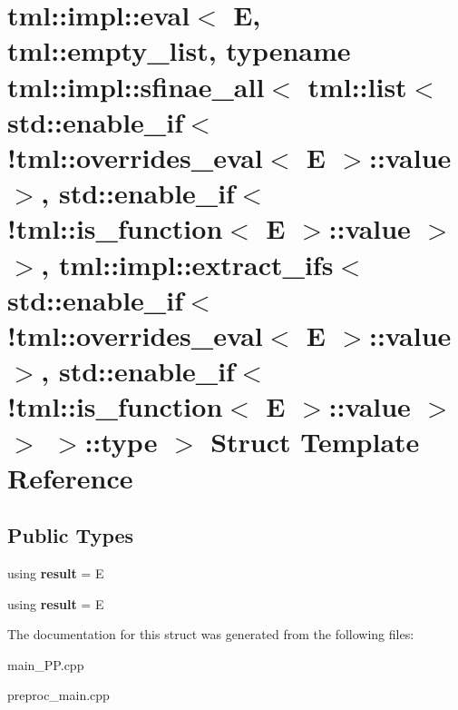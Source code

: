 \hypertarget{structtml_1_1impl_1_1eval_3_01E_00_01tml_1_1empty__list_00_01typename_01tml_1_1impl_1_1sfinae__a2edc21b9501629a5711bb9846b314ded}{\section{tml\+:\+:impl\+:\+:eval$<$ E, tml\+:\+:empty\+\_\+list, typename tml\+:\+:impl\+:\+:sfinae\+\_\+all$<$ tml\+:\+:list$<$ std\+:\+:enable\+\_\+if$<$!tml\+:\+:overrides\+\_\+eval$<$ E $>$\+:\+:value $>$, std\+:\+:enable\+\_\+if$<$!tml\+:\+:is\+\_\+function$<$ E $>$\+:\+:value $>$ $>$, tml\+:\+:impl\+:\+:extract\+\_\+ifs$<$ std\+:\+:enable\+\_\+if$<$!tml\+:\+:overrides\+\_\+eval$<$ E $>$\+:\+:value $>$, std\+:\+:enable\+\_\+if$<$!tml\+:\+:is\+\_\+function$<$ E $>$\+:\+:value $>$ $>$ $>$\+:\+:type $>$ Struct Template Reference}
\label{structtml_1_1impl_1_1eval_3_01E_00_01tml_1_1empty__list_00_01typename_01tml_1_1impl_1_1sfinae__a2edc21b9501629a5711bb9846b314ded}
}
\subsection*{Public Types}
\begin{DoxyCompactItemize}
\item 
\hypertarget{structtml_1_1impl_1_1eval_3_01E_00_01tml_1_1empty__list_00_01typename_01tml_1_1impl_1_1sfinae__a2edc21b9501629a5711bb9846b314ded_a8105230f1bb9da3978f75096d835c06b}{using {\bfseries result} = E}\label{structtml_1_1impl_1_1eval_3_01E_00_01tml_1_1empty__list_00_01typename_01tml_1_1impl_1_1sfinae__a2edc21b9501629a5711bb9846b314ded_a8105230f1bb9da3978f75096d835c06b}

\item 
\hypertarget{structtml_1_1impl_1_1eval_3_01E_00_01tml_1_1empty__list_00_01typename_01tml_1_1impl_1_1sfinae__a2edc21b9501629a5711bb9846b314ded_a8105230f1bb9da3978f75096d835c06b}{using {\bfseries result} = E}\label{structtml_1_1impl_1_1eval_3_01E_00_01tml_1_1empty__list_00_01typename_01tml_1_1impl_1_1sfinae__a2edc21b9501629a5711bb9846b314ded_a8105230f1bb9da3978f75096d835c06b}

\end{DoxyCompactItemize}


The documentation for this struct was generated from the following files\+:\begin{DoxyCompactItemize}
\item 
main\+\_\+\+P\+P.\+cpp\item 
preproc\+\_\+main.\+cpp\end{DoxyCompactItemize}
